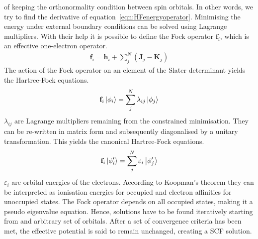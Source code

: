 of keeping the orthonormality condition between spin orbitals. In other words,
we try to find the derivative of equation~\eqref{eqn:HFenergyoperator}.
Minimising the energy under external boundary conditions can be solved using
Lagrange multipliers. With their help it is possible to define the Fock
operator $\mathbf{f}_i$, which is an effective one-electron operator.
%
\begin{align}
    \mathbf{f}_i=\mathbf{h}_i + \sum_j^N\left( \mathbf{J}_j - \mathbf{K}_j \right)
\end{align}
%
The action of the Fock operator on an element of the Slater determinant yields
the Hartree-Fock equations.
%
\begin{align}
    \mathbf{f}_i\ket{\phi_i}=\sum_j^N\lambda_{ij}\ket{\phi_j}\label{eqn:HFequations}
\end{align}
%
$\lambda_{ij}$ are Lagrange multipliers remaining from the constrained
minimisation. They can be re-written in matrix form and subsequently
diagonalised by a unitary transformation. This yields the canonical
Hartree-Fock equations.
%
\begin{align}
    \mathbf{f}_i\ket{\phi'_i}=\sum_j^N\varepsilon_i\ket{\phi'_j}\label{eqn:HFequationscanonical}
\end{align}
%
$\varepsilon_i$ are orbital energies of the electrons. According to Koopman's
theorem they can be interpreted as ionisation energies for occupied and
electron affinities for unoccupied states. The Fock operator depends on all
occupied states, making it a pseudo eigenvalue equation. Hence, solutions have
to be found iteratively starting from and arbitrary set of orbitals. After a
set of convergence criteria has been met, the effective potential is said to
remain unchanged, creating a \ac{SCF} solution.  \\ 

